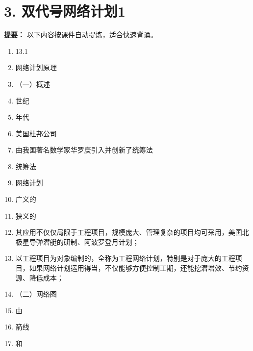 \documentclass[UTF8,fontset=fandol,11pt]{ctexart}
\begin{document}
\newpage

\section*{3. 双代号网络计划1}


\begin{mainbox}

\textbf{提要：} 以下内容按课件自动提炼，适合快速背诵。

\end{mainbox}

\begin{enumerate}[label=\arabic*.]

\item 13.1

\item 网络计划原理

\item （一）概述

\item 世纪

\item 年代

\item 美国杜邦公司

\item 由我国著名数学家华罗庚引入并创新了统筹法

\item 统筹法

\item 网络计划

\item 广义的

\item 狭义的

\item 其应用不仅仅局限于工程项目，规模庞大、管理复杂的项目均可采用，美国北极星导弹潜艇的研制、阿波罗登月计划；

\item 以工程项目为对象编制的，全称为工程网络计划，特别是对于庞大的工程项目，如果网络计划运用得当，不仅能够方便控制工期，还能挖潜增效、节约资源、降低成本；

\item （二）网络图

\item 由

\item 箭线

\item 和


\end{enumerate}
\end{document}
